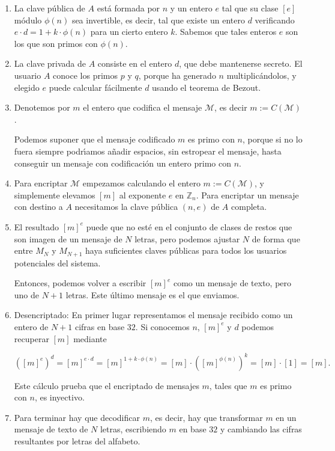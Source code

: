 \begin{enumerate}
\item  La {\sc clave p\'ublica} de $A$ est\'a formada por $n$ y un entero $e$
tal que su clase $[e]$ m\'odulo $\phi(n)$  
  sea invertible, es decir, tal que existe un entero $d$ verificando $e\cdot
d=1+k\cdot \phi(n)$ para un cierto entero $k$. Sabemos que tales enteros $e$ son
los que son primos con $\phi(n)$. 
 
\item  La {\sc clave privada} de $A$ consiste en el entero $d$, que debe
mantenerse secreto. El usuario $A$ conoce los primos $p$ y $q$, porque ha
generado $n$ multiplic\'andolos, y elegido $e$ puede calcular f\'acilmente $d$
usando el teorema de Bezout.
 
\item Denotemos por $m$ el entero que codifica el mensaje $\mathcal{M}$, es
decir  $m:=C(\mathcal{M})$.

Podemos suponer que el mensaje codificado $m$ es primo con $n$, porque si no lo
fuera siempre podr\'{\i}amos a\~nadir espacios, sin estropear el mensaje,  hasta
conseguir un mensaje con codificaci\'on un entero primo con $n$.  

\item Para {\sc encriptar} $\mathcal{M}$ empezamos calculando el entero
$m:=C(\mathcal{M})$, y simplemente elevamos $[m]$ al exponente  $e$ en
$\mathbb{Z}_n$. Para encriptar un mensaje con destino a $A$ necesitamos la clave
p\'ublica $(n,e)$  de $A$ completa.
 
 \item El resultado $[m]^e$ puede que no est\'e en el conjunto de clases de
restos que son imagen de un mensaje de $N$ letras, pero podemos  ajustar $N$ de
forma que entre $M_{N}$ y $M_{N+1}$ haya suficientes claves p\'ublicas para
todos los usuarios potenciales del sistema. 
 
 Entonces, podemos volver a escribir $[m]^e$ como un mensaje de texto, pero uno
de $N+1$ letras. Este \'ultimo mensaje es el que enviamos.
 
 \item {\sc Desencriptado:} En primer lugar representamos el mensaje recibido
como un entero de $N+1$ cifras en base $32$. Si conocemos $n$,  $[m]^e$ y $d$
podemos recuperar $[m]$ mediante
 
\[([m]^e)^d=[m]^{e\cdot d}=[m]^{1+k\cdot \phi(n)}=[m]\cdot
([m]^{\phi(n)})^k=[m]\cdot [1]=[m].\]

Este c\'alculo prueba que el encriptado de mensajes $m$, tales que $m$ es primo
con $n$, es inyectivo.
\item Para terminar hay que  decodificar $m$, es decir, hay que transformar $m$
en un mensaje de texto de $N$ letras, escribiendo $m$ en base $32$ y cambiando
las cifras resultantes por letras del alfabeto. 


\end{enumerate}
